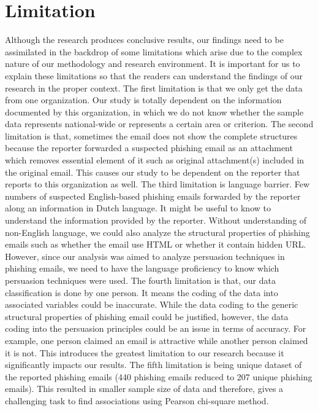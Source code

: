 \section{\label{sec:Limitation}Limitation}

Although the research produces conclusive results, our findings need
to be assimilated in the backdrop of some limitations which arise
due to the complex nature of our methodology and research environment.
It is important for us to explain these limitations so that the readers
can understand the findings of our research in the proper context.
The first limitation is that we only get the data from one organization.
Our study is totally dependent on the information documented by this
organization, in which we do not know whether the sample data represents
national-wide or represents a certain area or criterion. The second
limitation is that, sometimes the email does not show the complete
structures because the reporter forwarded a suspected phishing email
as an attachment which removes essential element of it such as original
attachment(s) included in the original email. This causes our study
to be dependent on the reporter that reports to this organization
as well. The third limitation is language barrier. Few numbers of
suspected English-based phishing emails forwarded by the reporter
along an information in Dutch language. It might be useful to know
to understand the information provided by the reporter. Without understanding
of non-English language, we could also analyze the structural properties
of phishing emails such as whether the email use HTML or whether it
contain hidden URL. However, since our analysis was aimed to analyze
persuasion techniques in phishing emails, we need to have the language
proficiency to know which persuasion techniques were used. The fourth
limitation is that, our data classification is done by one person.
It means the coding of the data into associated variables could be
inaccurate. While the data coding to the generic structural properties
of phishing email could be justified, however, the data coding into
the persuasion principles could be an issue in terms of accuracy.
For example, one person claimed an email is attractive while another
person claimed it is not. This introduces the greatest limitation
to our research because it significantly impacts our results. The
fifth limitation is being unique dataset of the reported phishing
emails (440 phishing emails reduced to 207 unique phishing emails).
This resulted in smaller sample size of data and therefore, gives
a challenging task to find associations using Pearson chi-square method.


